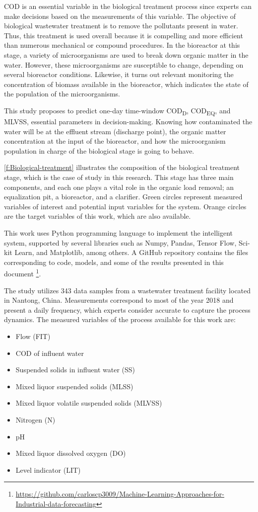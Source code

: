 \ac{COD} is an essential variable in the biological treatment process since experts can make decisions based on the measurements of this variable. The objective of biological wastewater treatment is to remove the pollutants present in water. Thus, this treatment is used overall because it is compelling and more efficient than numerous mechanical or compound procedures. In the bioreactor at this stage, a variety of microorganisms are used to break down organic matter in the water. However, these microorganisms are susceptible to change, depending on several bioreactor conditions. Likewise, it turns out relevant monitoring the concentration of biomass available in the bioreactor, which indicates the state of the population of the microorganisms.

This study proposes to predict one-day time-window \ac{COD}\textsubscript{D}, \ac{COD}\textsubscript{EQ}, and \ac{MLVSS}, essential parameters in decision-making. Knowing how contaminated the water will be at the effluent stream (discharge point), the organic matter concentration at the input of the bioreactor, and how the microorganism population in charge of the biological stage is going to behave. 

\autoref{f:Biological-treatment} illustrates the composition of the biological treatment stage, which is the case of study in this research. This stage has three main components, and each one plays a vital role in the organic load removal; an equalization pit, a bioreactor, and a clarifier. Green circles represent measured variables of interest and potential input variables for the system. Orange circles are the target variables of this work, which are also available.

This work uses Python programming language to implement the intelligent system, supported by several libraries such as Numpy, Pandas, Tensor Flow, Sci-kit Learn, and Matplotlib, among others. A GitHub repository contains the files corresponding to code, models, and some of the results presented in this document \footnote{\url{https://github.com/carloscp3009/Machine-Learning-Approaches-for-Industrial-data-forecasting}}. 

The study utilizes 343 data samples from a wastewater treatment facility located in Nantong, China. Measurements correspond to most of the year 2018 and present a daily frequency, which experts consider accurate to capture the process dynamics. The measured variables of the process available for this work are:

\begin{itemize}
 \item	Flow (FIT)
 \item	COD of influent water
 \item	Suspended solids in influent water (SS)
 \item	Mixed liquor suspended solids (MLSS)
 \item	Mixed liquor volatile suspended solids (MLVSS)
 \item	Nitrogen (N)
 \item	pH
 \item	Mixed liquor dissolved oxygen (DO)
 \item	Level indicator (LIT)
\end{itemize}

